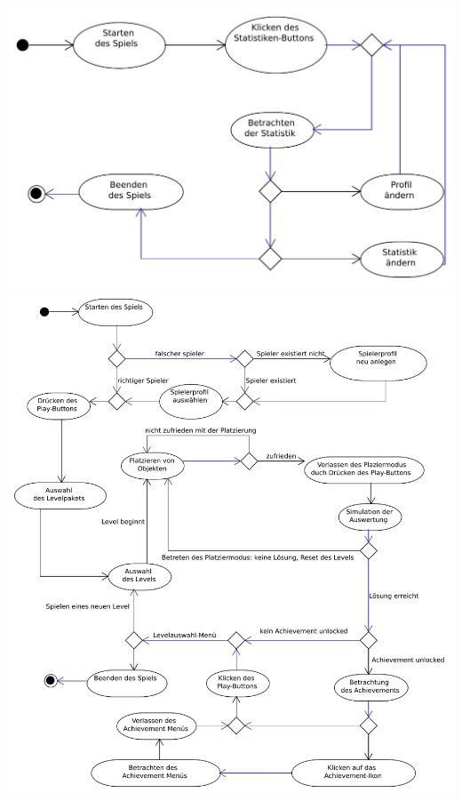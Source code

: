 \clearpage
\includegraphics[scale=0.6]{Systemmodelle/parent_activity.pdf}
\clearpage
\includegraphics[scale=0.6]{Systemmodelle/start_activity.pdf}
